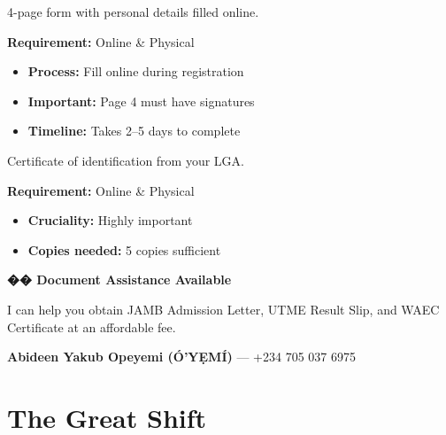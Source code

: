 \documentclass[11pt,a4paper]{article}
\begin{document}
\begin{tcolorbox}[colback=lightGray,colframe=primary,title={\color{white}\textbf{�� Bio-Data Form}},colbacktitle=primary,arc=4pt,breakable]
4-page form with personal details filled online.

\textbf{Requirement:} \textcolor{successGreen}{Online \& Physical}

\begin{itemize}[leftmargin=1em, itemsep=0.2em]
    \item \textbf{Process:} Fill online during registration
    \item \textbf{Important:} Page 4 must have signatures
    \item \textbf{Timeline:} Takes 2--5 days to complete
\end{itemize}
\end{tcolorbox}

\begin{tcolorbox}[colback=lightGray,colframe=primary,title={\color{white}\textbf{�� Local Government ID}},colbacktitle=primary,arc=4pt,breakable]
Certificate of identification from your LGA.

\textbf{Requirement:} \textcolor{successGreen}{Online \& Physical}

\begin{itemize}[leftmargin=1em, itemsep=0.2em]
    \item \textbf{Cruciality:} Highly important
    \item \textbf{Copies needed:} 5 copies sufficient
\end{itemize}
\end{tcolorbox}

\begin{inspirational}
    \textbf{\color{primary}\Large �� Document Assistance Available}

    \vspace{0.5em}

    I can help you obtain JAMB Admission Letter, UTME Result Slip, and WAEC Certificate at an affordable fee.

    \vspace{0.5em}

    \textbf{Abideen Yakub Opeyemi (Ó'YẸMÍ)} --- +234 705 037 6975
\end{inspirational}

\newpage
\section{The Great Shift}
\end{document}
